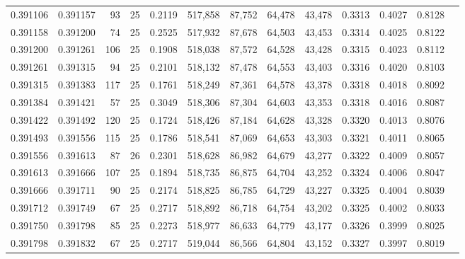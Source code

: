 \begin{tabular}{rrrrrrrrrrrrr}
0.391106 & 0.391157 &    93 &  25 &                                     0.2119 & 517,858 &  87,752 &  64,478 &  43,478 & 0.3313 & 0.4027 & 0.8128 \\
0.391158 & 0.391200 &    74 &  25 &                                     0.2525 & 517,932 &  87,678 &  64,503 &  43,453 & 0.3314 & 0.4025 & 0.8122 \\
0.391200 & 0.391261 &   106 &  25 &                                     0.1908 & 518,038 &  87,572 &  64,528 &  43,428 & 0.3315 & 0.4023 & 0.8112 \\
0.391261 & 0.391315 &    94 &  25 &                                     0.2101 & 518,132 &  87,478 &  64,553 &  43,403 & 0.3316 & 0.4020 & 0.8103 \\
0.391315 & 0.391383 &   117 &  25 &                                     0.1761 & 518,249 &  87,361 &  64,578 &  43,378 & 0.3318 & 0.4018 & 0.8092 \\
0.391384 & 0.391421 &    57 &  25 &                                     0.3049 & 518,306 &  87,304 &  64,603 &  43,353 & 0.3318 & 0.4016 & 0.8087 \\
0.391422 & 0.391492 &   120 &  25 &                                     0.1724 & 518,426 &  87,184 &  64,628 &  43,328 & 0.3320 & 0.4013 & 0.8076 \\
0.391493 & 0.391556 &   115 &  25 &                                     0.1786 & 518,541 &  87,069 &  64,653 &  43,303 & 0.3321 & 0.4011 & 0.8065 \\
0.391556 & 0.391613 &    87 &  26 &                                     0.2301 & 518,628 &  86,982 &  64,679 &  43,277 & 0.3322 & 0.4009 & 0.8057 \\
0.391613 & 0.391666 &   107 &  25 &                                     0.1894 & 518,735 &  86,875 &  64,704 &  43,252 & 0.3324 & 0.4006 & 0.8047 \\
0.391666 & 0.391711 &    90 &  25 &                                     0.2174 & 518,825 &  86,785 &  64,729 &  43,227 & 0.3325 & 0.4004 & 0.8039 \\
0.391712 & 0.391749 &    67 &  25 &                                     0.2717 & 518,892 &  86,718 &  64,754 &  43,202 & 0.3325 & 0.4002 & 0.8033 \\
0.391750 & 0.391798 &    85 &  25 &                                     0.2273 & 518,977 &  86,633 &  64,779 &  43,177 & 0.3326 & 0.3999 & 0.8025 \\
0.391798 & 0.391832 &    67 &  25 &                                     0.2717 & 519,044 &  86,566 &  64,804 &  43,152 & 0.3327 & 0.3997 & 0.8019 \\

\end{tabular}
